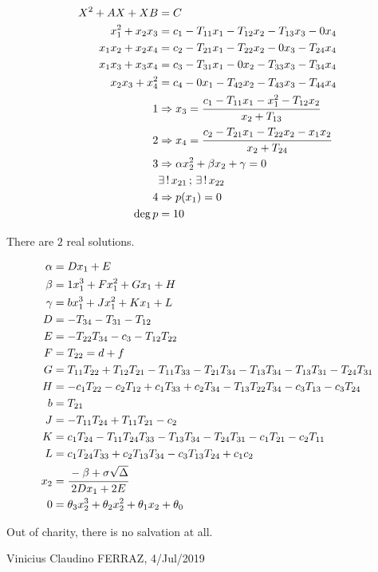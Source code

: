 \documentclass[12pt,a4paper]{article}
\begin{document}
\begin{align}
  X^2 + AX + XB &= C \\
  x_1^2 + x_2 x_3 &= c_1 - T_{11} x_1 - T_{12} x_2 - T_{13} x_3 - 0 x_4 \\
  x_1 x_2 + x_2 x_4 &= c_2 - T_{21} x_1 - T_{22} x_2 - 0 x_3 - T_{24} x_4 \\
  x_1 x_3 + x_3 x_4 &= c_3 - T_{31} x_1 - 0 x_2 - T_{33} x_3 - T_{34} x_4 \\
  x_2 x_3 + x_4^2 &= c_4 - 0 x_1 - T_{42} x_2 - T_{43} x_3 - T_{44} x_4 \\
  1 &\Rightarrow x_3 = \cfrac{c_1 - T_{11} x_1 - x_1^2 - T_{12} x_2}{x_2 + T_{13}} \\
  2 &\Rightarrow x_4 = \cfrac{c_2 - T_{21} x_1 - T_{22} x_2 - x_1 x_2}{x_2 + T_{24}} \\
  3 &\Rightarrow \alpha x_2^2 + \beta x_2 + \gamma = 0 \\
  &\exists\,!\,x_{21}\,;\,\exists\,!\,x_{22} \\
  4 &\Rightarrow p(x_1) = 0 \\
  \deg p &= 10
\end{align}

	There are $2$ real solutions.

\begin{align}
  \alpha &= D x_1 + E \\
  \beta &= 1 x_1^3 + F x_1^2 + G x_1 + H \\
  \gamma &= b x_1^3 + J x_1^2 + K x_1 + L \\
  D &= - T_{34} - T_{31} - T_{12} \\
  E &= - T_{22} T_{34} - c_3 - T_{12} T_{22} \\
  F &= T_{22} = d + f \\
  G &= T_{11} T_{22} + T_{12} T_{21} - T_{11} T_{33} - T_{21} T_{34} - T_{13} T_{34} - T_{13} T_{31} - T_{24} T_{31} \\
  H &= - c_1 T_{22} - c_2 T_{12} + c_1 T_{33} + c_2 T_{34} - T_{13} T_{22} T_{34} - c_3 T_{13} - c_3 T_{24} \\
  b &= T_{21} \\
  J &= - T_{11} T_{24} + T_{11} T_{21} - c_2 \\
  K &= c_1 T_{24} - T_{11} T_{24} T_{33} - T_{13} T_{34} - T_{24} T_{31} - c_1 T_{21} - c_2 T_{11} \\
  L &= c_1 T_{24} T_{33} + c_2 T_{13} T_{34} - c_3 T_{13} T_{24} + c_1 c_2 \\
   x_2 &= \cfrac{- \beta + \sigma \sqrt{\Delta}}{2D x_1 + 2E} \\
  0 &= \theta_3 x_2^3 + \theta_2 x_2^2 + \theta_1 x_2 + \theta_0
\end{align}

\vspace{3mm}

Out of charity, there is no salvation at all.

\vspace{3mm}

Vinicius Claudino FERRAZ, 4/Jul/2019
\end{document}
